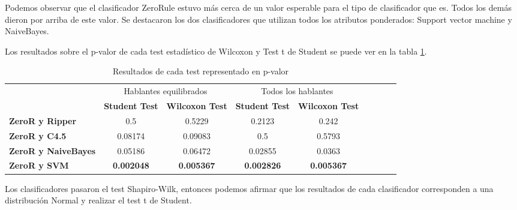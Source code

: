 
Podemos observar que el clasificador ZeroRule estuvo más cerca de un valor esperable para el tipo de clasificador que es. Todos los demás dieron por arriba de este valor. Se destacaron los dos clasificadores que utilizan todos los atributos ponderados: Support vector machine y NaiveBayes.

Los resultados sobre el p-valor de cada test estadístico de Wilcoxon y Test t de Student se puede ver en la tabla \ref{PAH_res_tests_wilcoxon_student}.

\begin{table}[H]
	\centering
	\footnotesize 
	\begin{tabular}{|l|c|c|c|c|c|c|c|c|}
		\hline
		\multirow{2}{*}{ }  & \multicolumn{2}{c|}{Hablantes equilibrados } & \multicolumn{2}{|c|}{Todos los hablantes} \\ \cline{2-5}
		& \textbf{Student Test} & \textbf{Wilcoxon Test} & \textbf{Student Test} & \textbf{Wilcoxon Test} \\ \hline		
			\textbf{ZeroR y Ripper} & 0.5 & 0.5229 & 0.2123 & 0.242 \\ \hline
			\textbf{ZeroR y C4.5} & 0.08174 & 0.09083 & 0.5 & 0.5793 \\ \hline
			\textbf{ZeroR y NaiveBayes} & 0.05186 & 0.06472 & 0.02855 & 0.0363 \\ \hline
			\textbf{ZeroR y SVM} & \textbf{0.002048} & \textbf{0.005367} & \textbf{0.002826} & \textbf{0.005367} \\ \hline
	\end{tabular}
	\caption{Resultados de cada test representado en p-valor}
	\label{PAH_res_tests_wilcoxon_student}
\end{table}

Los clasificadores pasaron el test Shapiro-Wilk, entonces podemos afirmar que los resultados de cada clasificador corresponden a una distribución Normal y realizar el test t de Student.

